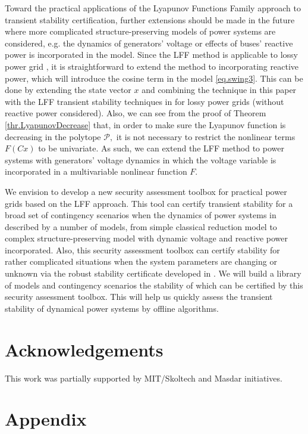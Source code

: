 \documentclass[final]{IEEEtran}
\begin{document}
Toward the practical applications of the Lyapunov Functions Family approach to transient stability certification, further extensions should be made in the future where more complicated structure-preserving models of power systems are considered,
  e.g. the dynamics of generators' voltage or effects of buses' reactive power is incorporated in the model.
Since the LFF method is applicable to lossy power grid \cite{Vu:2014acc}, it is straightforward to extend the method to incorporating reactive power,
which will introduce the cosine term in the model \eqref{eq.swing3}. This can be done by extending the state vector $x$ and combining the technique in this paper with the LFF transient stability
techniques in \cite{Vu:2014acc} for lossy power grids (without reactive power considered). Also, we can see from the proof of Theorem \ref{thr.LyapunovDecrease}
that, in order to make sure the Lyapunov function is decreasing in the polytope $\mathcal{P},$ it is not necessary to restrict the nonlinear terms $F(Cx)$
to be univariate. As such, we can extend the LFF method to power systems with generators' voltage dynamics in which the voltage variable is incorporated in a multivariable nonlinear function $F.$

We envision to develop a new security assessment toolbox for practical power grids based on the LFF approach. This tool can certify transient stability for a broad set of contingency scenarios when the dynamics of power systems in described by a number of models, from simple classical reduction model to complex
structure-preserving model with dynamic voltage and reactive power incorporated. Also, this security assessment toolbox can certify stability for rather complicated situations when the system parameters are changing or unknown via the robust stability certificate developed in \cite{Vu:2014acc}. We will build a library of models and contingency scenarios the stability of which can be certified by this security assessment toolbox. This will help us quickly assess the transient stability of dynamical power systems by offline algorithms.  

\section{Acknowledgements}
This work was partially supported by MIT/Skoltech and
Masdar initiatives.

\section{Appendix}
\end{document}
